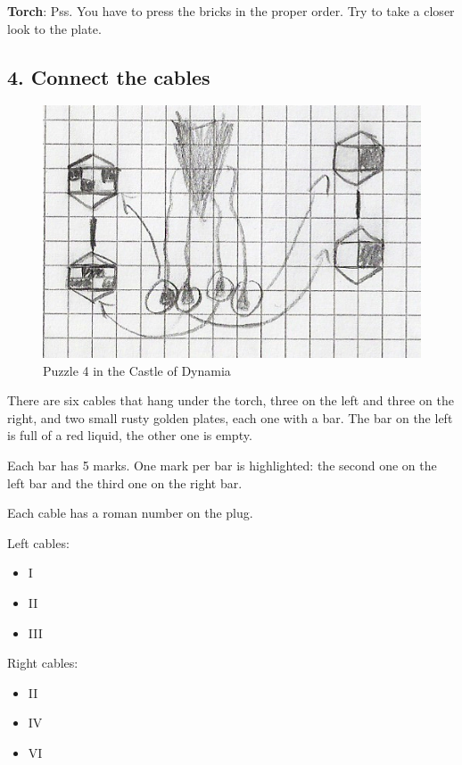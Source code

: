 \textbf{Torch}: Pss. You have to press the bricks in the proper order. Try to take a closer look to the plate.

\subsection{4. Connect the cables}

\begin{figure}[H]
  \centering
  \includegraphics[width=\textwidth]{Images/Puzzles/castleOfDynamia_4}
  \caption{Puzzle 4 in the Castle of Dynamia}
\end{figure}


There are six cables that hang under the torch, three on the left and three on the right, and two small rusty golden plates, each one with a bar. The bar on the left is full of a red liquid, the other one is empty.

Each bar has 5 marks. One mark per bar is highlighted: the second one on the left bar and the third one on the right bar.

Each cable has a roman number on the plug.

Left cables:
\begin{itemize}
	\item I
	\item II
	\item III
\end{itemize}

Right cables:
\begin{itemize}
	\item II
	\item IV
	\item VI
\end{itemize}

